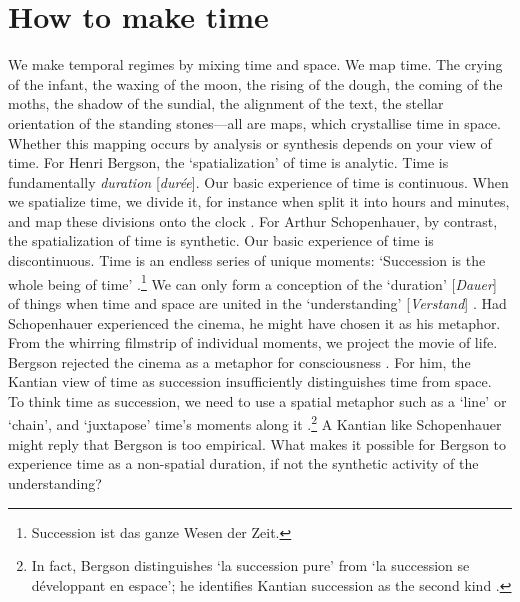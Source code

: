 \documentclass[Royal,times,sageh]{sagej}
\begin{document}
\hypertarget{how-to-make-time}{%
\section{How to make time}\label{how-to-make-time}}

We make temporal regimes by mixing time and space. We map time. The
crying of the infant, the waxing of the moon, the rising of the dough,
the coming of the moths, the shadow of the sundial, the alignment of the
text, the stellar orientation of the standing stones---all are maps,
which crystallise time in space. Whether this mapping occurs by analysis
or synthesis depends on your view of time. For Henri Bergson, the
`spatialization' of time is analytic. Time is fundamentally
\emph{duration} {[}\emph{durée}{]}. Our basic experience of time is
continuous. When we spatialize time, we divide it, for instance when
split it into hours and minutes, and map these divisions onto the clock
\citeyearpar[pp.~71-72]{bergson_oeuvres_1984}. For Arthur Schopenhauer,
by contrast, the spatialization of time is synthetic. Our basic
experience of time is discontinuous. Time is an endless series of unique
moments: `Succession is the whole being of time' \citep[vol.1,
p.~37]{schopenhauer_werke_1999}.\footnote{Succession ist das ganze Wesen
  der Zeit.} We can only form a conception of the `duration'
{[}\emph{Dauer}{]} of things when time and space are united in the
`understanding' {[}\emph{Verstand}{]} \citeyearpar[vol.~1,
p.~40]{schopenhauer_werke_1999}. Had Schopenhauer experienced the
cinema, he might have chosen it as his metaphor. From the whirring
filmstrip of individual moments, we project the movie of life. Bergson
rejected the cinema as a metaphor for consciousness
\citeyearpar[pp.~752ff]{bergson_oeuvres_1984}. For him, the Kantian view
of time as succession insufficiently distinguishes time from space. To
think time as succession, we need to use a spatial metaphor such as a
`line' or `chain', and `juxtapose' time's moments along it
\citeyearpar[pp.~68]{bergson_oeuvres_1984}.\footnote{In fact, Bergson
  distinguishes `la succession pure' from `la succession se développant
  en espace'; he identifies Kantian succession as the second kind
  \citeyearpar[p.~151]{bergson_oeuvres_1984}.} A Kantian like
Schopenhauer might reply that Bergson is too empirical. What makes it
possible for Bergson to experience time as a non-spatial duration, if
not the synthetic activity of the understanding?
\end{document}
